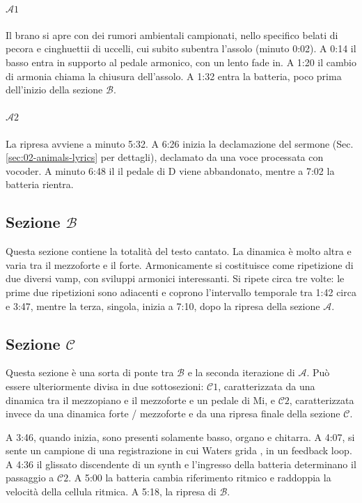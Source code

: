 \documentclass[class=book, crop=false, oneside, 12pt]{standalone}
\begin{document}
    \paragraph{\(\mathcal{A}1\)} 
    Il brano si apre con dei rumori ambientali campionati, nello specifico belati di pecora e cinghuettii di uccelli, cui subito  subentra l'assolo (minuto 0:02). A 0:14 il basso entra in supporto al pedale armonico, con un lento fade in. A 1:20 il cambio di armonia chiama la chiusura dell'assolo. A 1:32 entra la batteria, poco prima dell'inizio della sezione \(\mathcal{B}\).

    \paragraph{\(\mathcal{A}2\)} 
    La ripresa avviene a minuto 5:32. A 6:26 inizia la declamazione del sermone (Sec.\ref{sec:02-animals-lyrics} per dettagli), declamato da una voce processata con vocoder. A minuto 6:48 il il pedale di D viene abbandonato, mentre a 7:02 la batteria rientra.

    \subsection*{Sezione \(\mathcal{B}\)}
    Questa sezione contiene la totalità del testo cantato. La dinamica è molto altra e varia tra il mezzoforte e il forte. Armonicamente si costituisce come ripetizione di due diversi vamp, con sviluppi armonici interessanti. Si ripete circa tre volte: le prime due ripetizioni sono adiacenti e coprono l'intervallo temporale tra 1:42 circa e 3:47, mentre la terza, singola,  inizia a 7:10, dopo la ripresa della sezione \(\mathcal{A}\).

    \subsection*{Sezione \(\mathcal{C}\)}
    Questa sezione è una sorta di ponte tra \(\mathcal{B}\) e la seconda iterazione di \(\mathcal{A}\). Può essere ulteriormente divisa in due sottosezioni: \(\mathcal{C}1\), caratterizzata da una dinamica tra il mezzopiano e il mezzoforte e un pedale di Mi, e \(\mathcal{C}2\), caratterizzata invece da una dinamica forte / mezzoforte e da una ripresa finale della sezione \(\mathcal{C}\).

    A 3:46, quando inizia, sono presenti solamente basso, organo e chitarra. A 4:07, si sente un campione  di una registrazione in cui Waters grida , in un feedback loop. A 4:36 il glissato discendente di un synth e l'ingresso della batteria determinano il passaggio a \(\mathcal{C}2\). A 5:00 la batteria cambia riferimento ritmico e raddoppia la velocità della cellula ritmica. A 5:18, la ripresa di \(\mathcal{B}\).
\end{document}
